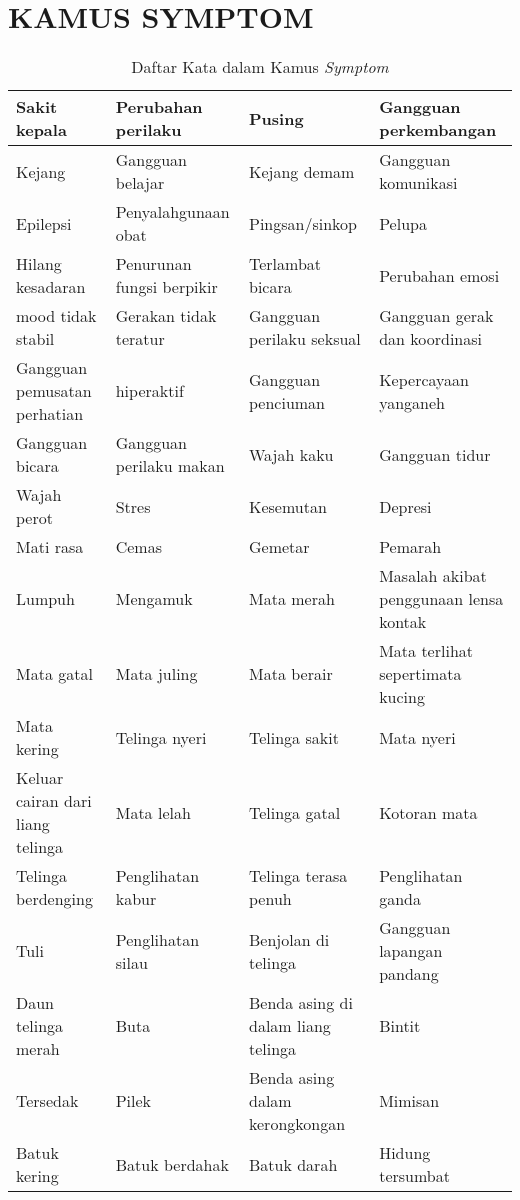 \section{KAMUS SYMPTOM}
\begin{longtable}{|p{}|p{}|p{}|p{}|}

	\caption{Daftar Kata dalam Kamus \textit{Symptom}}\label{lampiran:symptom}\\
	\hline
	Sakit kepala & Perubahan perilaku & Pusing & Gangguan perkembangan \\ \hline
	Kejang & Gangguan belajar & Kejang demam & Gangguan komunikasi \\ \hline
	Epilepsi & Penyalahgunaan obat & Pingsan/sinkop & Pelupa \\ \hline
	Hilang kesadaran & Penurunan fungsi berpikir & Terlambat bicara & Perubahan emosi \\ \hline
	mood tidak stabil & Gerakan tidak teratur & Gangguan perilaku seksual & Gangguan gerak dan koordinasi \\ \hline
	Gangguan pemusatan perhatian & hiperaktif & Gangguan penciuman & Kepercayaan yanganeh \\ \hline
	Gangguan bicara & Gangguan perilaku makan & Wajah kaku & Gangguan tidur \\ \hline
	Wajah perot & Stres & Kesemutan & Depresi \\ \hline
	Mati rasa & Cemas & Gemetar & Pemarah \\ \hline
	Lumpuh & Mengamuk & Mata merah & Masalah akibat penggunaan lensa kontak \\ \hline
	Mata gatal & Mata juling & Mata berair & Mata terlihat sepertimata kucing \\ \hline
	Mata kering & Telinga nyeri & Telinga sakit & Mata nyeri \\ \hline
	Keluar cairan dari liang telinga & Mata lelah & Telinga gatal & Kotoran mata \\ \hline
	Telinga berdenging & Penglihatan kabur & Telinga terasa penuh & Penglihatan ganda \\ \hline
	Tuli & Penglihatan silau & Benjolan di telinga & Gangguan lapangan pandang \\ \hline
	Daun telinga merah & Buta & Benda asing di dalam liang telinga & Bintit \\ \hline
	Tersedak & Pilek & Benda asing dalam kerongkongan & Mimisan \\ \hline
	Batuk kering & Batuk berdahak & Batuk darah & Hidung tersumbat \\ \hline

\end{longtable}
